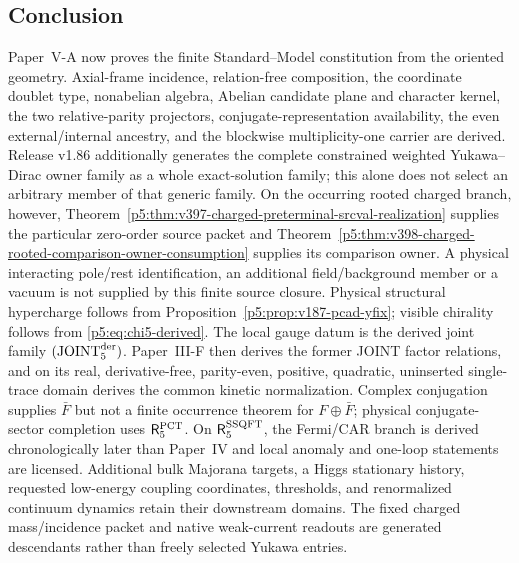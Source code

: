 \documentclass[12pt,a4paper]{article}
\begin{document}
\subsection{Conclusion}
\label{p5:sec:conclusion}
Paper~V-A now proves the finite Standard--Model constitution from the oriented
geometry.  Axial-frame incidence, relation-free composition, the coordinate
doublet type, nonabelian algebra, Abelian candidate plane and character
kernel, the two relative-parity projectors, conjugate-representation
availability, the even external/internal ancestry, and the blockwise
multiplicity-one carrier are derived.  Release v1.86 additionally generates the complete constrained weighted
Yukawa--Dirac owner family as a whole exact-solution family; this alone does not
select an arbitrary member of that generic family. On the occurring rooted
charged branch, however, Theorem~\ref{p5:thm:v397-charged-preterminal-srcval-realization}
supplies the particular zero-order source packet and
Theorem~\ref{p5:thm:v398-charged-rooted-comparison-owner-consumption}
supplies its comparison owner. A physical interacting pole/rest identification,
an additional field/background member or a vacuum is not supplied by this
finite source closure.  Physical structural hypercharge follows from
Proposition~\ref{p5:prop:v187-pcad-yfix}; visible chirality follows from
\eqref{p5:eq:chi5-derived}.  The local gauge datum is the derived joint family
\(({\rm JOINT}_5^{\rm der})\).  Paper~III-F then derives the former JOINT
factor relations, and on its real, derivative-free, parity-even, positive,
quadratic, uninserted single-trace domain derives the common kinetic
normalization.  Complex conjugation supplies \(\bar F\) but not a finite
occurrence theorem for \(F\oplus\bar F\); physical conjugate-sector completion
uses \(\mathsf R_5^{\rm PCT}\).  On
\(\mathsf R_5^{\rm SSQFT}\), the Fermi/CAR branch is derived chronologically
later than Paper~IV and local anomaly and one-loop statements are licensed.
Additional bulk Majorana targets, a Higgs stationary history, requested
low-energy coupling coordinates, thresholds, and renormalized continuum
dynamics retain their downstream domains. The fixed charged mass/incidence
packet and native weak-current readouts are generated descendants rather
than freely selected Yukawa entries.
\end{document}
